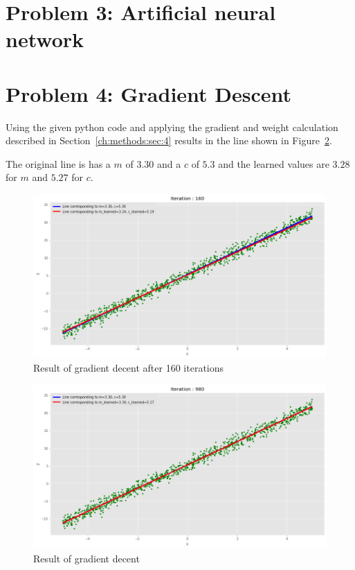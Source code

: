 \section{Problem 3: Artificial neural network}

\section{Problem 4: Gradient Descent}

Using the given python code and applying the gradient and weight calculation described in Section~\ref{ch:methods:sec:4} results in the line shown in Figure~\ref{problem4_result}.

The original line is has a $m$ of $3.30$ and a $c$ of $5.3$ and the learned values are $3.28$ for $m$ and $5.27$ for $c$.

\begin{figure}[h]
	\centering
    \includegraphics[width=17cm]{img/problem4_result_160.png}
	\caption{Result of gradient decent after 160 iterations}
    \label{problem4_result_160}
\end{figure}

\begin{figure}[h]
	\centering
    \includegraphics[width=17cm]{img/problem4_result.png}
	\caption{Result of gradient decent}
    \label{problem4_result}
\end{figure}

